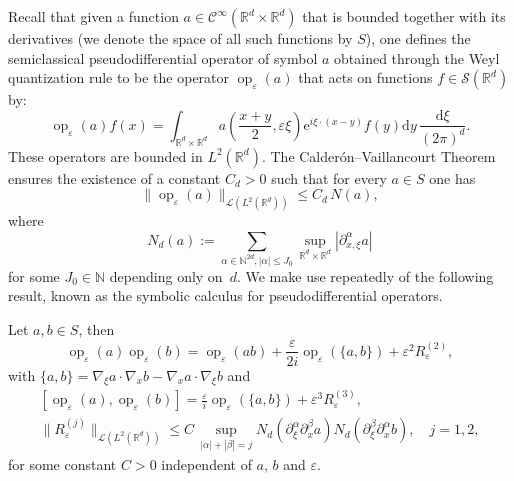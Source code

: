 \documentclass[AHL,Unicode,longabstracts]{cedram}
\DeclareMathOperator{\op}{op}
\newcommand*\R{{\mathbb R}}
\newcommand*\N{{\mathbb N}}
\newcommand*\eps{\varepsilon}
\numberwithin{equation}{section}
\newcommand{\ee}{{\mathrm e}}
\newcommand*{\dd}{\mathrm{d}}
\newcommand*{\dy}{\dd y}
\newcommand*{\dxi}{\dd \xi}
\begin{document}

Recall that given a function $a\in\mathcal{C}^\infty(\R^d\times\R^d)$ that is bounded together with its derivatives (we denote the space of all such functions by ${S}$), one defines the semiclassical pseudodifferential operator of symbol $a$ obtained through the Weyl quantization rule to be the operator $\op_\eps(a)$ that acts on functions $f\in\mathcal{S}(\R^d)$ by:
\[
\op_\eps(a) f(x)=\int_{\R^{d}\times\R^d} a\left(\frac{x+y}{2},\eps\xi\right) {\ee}^{i \xi\cdot (x-y)} f(y)\dy\,\frac{\dxi}{(2\pi)^d}.
\]
These operators are bounded in $L^2(\R^d)$. The Calderón--Vaillancourt Theorem~\cite{CV} ensures the existence of a constant $C_d>0$ such that for every $ a\in S$ one has
\begin{equation}\label{est:pseudo}
\| \op_\eps(a)\|_{{\mathcal L}(L^2(\R^d))}\leq C_d\, N(a),
\end{equation}
where
\[
N_d(a):=\sum_{\alpha\in\N^{2d},|\alpha|\leq J_0} \sup_{\R^d\times\R^d}|\partial_{x,\xi}^\alpha a|
\]
for some $J_0\in\N$ depending only on~$d$. We make use repeatedly of the following result, known as the symbolic calculus for pseudodifferential operators.

\begin{prop}\label{prop:symbol}
Let $a,b\in S$, then
\[
\op_\eps(a)\op_\eps(b) = \op_\eps(ab)+\frac{\eps}{2i} \op_\eps(\{a,b\})+\eps^2 R^{(2)}_\eps,
\]
with $\{a,b\}=\nabla_\xi a \cdot \nabla _x b-\nabla _xa\cdot \nabla_\xi b$ and
\begin{gather*}
\left[\op_\eps(a),\op_\eps(b)\right] =\frac{\eps}{i}\op_\eps(\{a,b\}) +\eps^3 R_\eps^{(3)},
\\
\| R^{(j)}_\eps\|_{{\mathcal L}(L^2(\R^d))}\leq C \,\sup_{|\alpha|+|\beta|=j} N_d(\partial_\xi^\alpha \partial_x^{\beta} a) N_d(
\partial_\xi^\beta \partial_x^{\alpha} b),\quad j=1,2,
\end{gather*}
for some constant $C>0$ independent of $a$, $b$ and $\eps$.
\end{prop}
\end{document}

